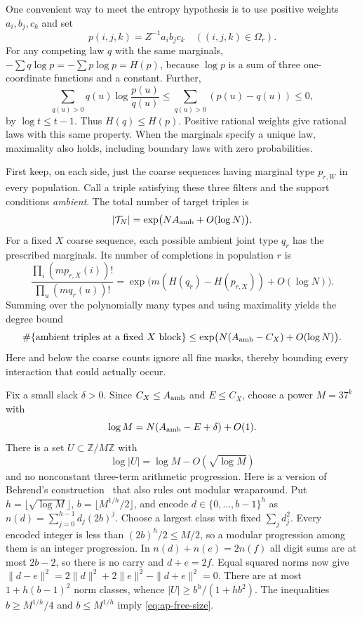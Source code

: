 One convenient way to meet the entropy hypothesis is to use positive
weights $a_i,b_j,c_k$ and set
\[
 p(i,j,k)=Z^{-1}a_i b_j c_k\quad ((i,j,k)\in\Omega_r).
\]
For any competing law $q$ with the same marginals,
$-\sum q\log p=-\sum p\log p=H(p)$, because $\log p$ is a sum
of three one-coordinate functions and a constant.  Further,
\[
 \sum_{q(u)>0}q(u)\log\frac{p(u)}{q(u)}
 \le \sum_{q(u)>0}(p(u)-q(u))\le0,
\]
by $\log t\le t-1$.  Thus $H(q)\le H(p)$.
Positive rational weights give rational laws with this same property.
When the marginals specify a unique law, maximality also holds,
including boundary laws with zero probabilities.

First keep, on each side, just the coarse sequences having marginal
type $p_{r,W}$ in every population.  Call a triple satisfying these
three filters and the support conditions \emph{ambient}.  The total
number of target triples is
\begin{equation}\label{eq:target-count}
 |\mathcal T_N|=\exp\bigl(NA_{\rm amb}+O(\log N)\bigr).
\end{equation}
For a fixed $X$ coarse sequence, each possible ambient joint type
$q_r$ has the prescribed marginals.  Its number of completions in
population $r$ is
\[
 \frac{\prod_i(mp_{r,X}(i))!}{\prod_u(mq_r(u))!}
 =\exp\bigl(m(H(q_r)-H(p_{r,X}))+O(\log N)\bigr).
\]
Summing over the polynomially many types and using maximality yields
the degree bound
\begin{equation}\label{eq:ambient-x-degree}
 \#\{\text{ambient triples at a fixed $X$ block}\}
 \le \exp\bigl(N(A_{\rm amb}-C_X)+O(\log N)\bigr).
\end{equation}
Here and below the coarse counts ignore all fine masks, thereby
bounding every interaction that could actually occur.

Fix a small slack $\delta>0$.  Since $C_X\le A_{\rm amb}$ and
$E\le C_X$, choose a power $M=37^k$ with
\begin{equation}\label{eq:hash-size}
 \log M=N(A_{\rm amb}-E+\delta)+O(1).
\end{equation}
There is a set $U\subset\mathbb Z/M\mathbb Z$ with
\begin{equation}\label{eq:ap-free-size}
 \log|U|=\log M-O(\sqrt{\log M})
\end{equation}
and no nonconstant three-term arithmetic progression.  Here is a
version of Behrend's construction~\cite{Behrend1946} that also rules
out modular wraparound.  Put
$h=\lfloor\sqrt{\log M}\rfloor$, $b=\lfloor M^{1/h}/2\rfloor$,
and encode $d\in\{0,\ldots,b-1\}^h$ as
$n(d)=\sum_{j=0}^{h-1}d_j(2b)^j$.  Choose a largest class with
fixed $\sum_jd_j^2$.  Every encoded integer is less than
$(2b)^h/2\le M/2$, so a modular progression among them is an
integer progression.  In $n(d)+n(e)=2n(f)$ all digit sums are at
most $2b-2$, so there is no carry and $d+e=2f$.
Equal squared norms now give
$\|d-e\|^2=2\|d\|^2+2\|e\|^2-\|d+e\|^2=0$.
There are at most $1+h(b-1)^2$ norm classes, whence
$|U|\ge b^h/(1+hb^2)$.  The inequalities
$b\ge M^{1/h}/4$ and $b\le M^{1/h}$ imply
\eqref{eq:ap-free-size}.

